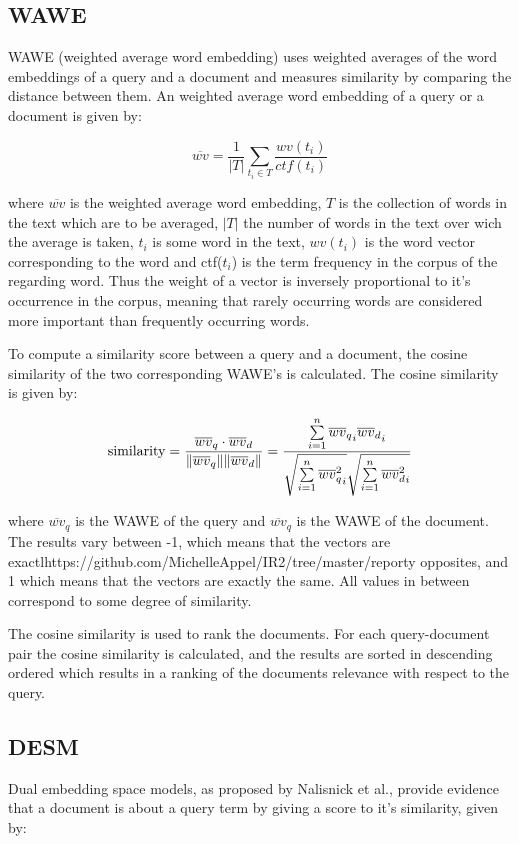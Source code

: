 \documentclass{article}
\begin{document}
\subsection{WAWE}
WAWE (weighted average word embedding) uses weighted averages of the word embeddings of a query and a document and measures similarity by comparing the distance between them. An weighted average word embedding of a query or a document is given by:

$$ \overline{wv} = \frac{1}{|T|} \sum_{t_i \in T} \frac{wv(t_i)}{ctf(t_i)}$$

where $\overline{wv}$ is the weighted average word embedding, $T$ is the collection of words in the text which are to be averaged, $|T|$ the number of words in the text over wich the average is taken, $t_i$ is some word in the text, $wv(t_i)$ is the word vector corresponding to the word and ctf($t_i$) is the term frequency in the corpus of the regarding word. Thus the weight of a vector is inversely proportional to it's occurrence in the corpus, meaning that rarely occurring words are considered more important than frequently occurring words.

To compute a similarity score between a query and a document, the cosine similarity of the two corresponding WAWE's is calculated. The cosine similarity is given by:


$$\text{similarity} = {\overline{wv}_q \cdot \overline{wv}_d \over \|\overline{wv}_q\| \|\overline{wv}_d\|} = \frac{ \sum\limits_{i=1}^{n}{{\overline{wv}_q}_i  {\overline{wv}_d}}_i }{ \sqrt{\sum\limits_{i=1}^{n}{{\overline{wv}_q^2}}_i}  \sqrt{\sum\limits_{i=1}^{n}{{\overline{wv}_d^2}_i}} }$$ 

where $\overline{wv}_q$ is the WAWE of the query and $\overline{wv}_q$ is the WAWE of the document. The results vary between -1, which means that the vectors are exactlhttps://github.com/MichelleAppel/IR2/tree/master/reporty opposites, and 1 which means that the vectors are exactly the same. All values in between correspond to some degree of similarity.

The cosine similarity is used to rank the documents. For each query-document pair the cosine similarity is calculated, and the results are sorted in descending ordered which results in a ranking of the documents relevance with respect to the query.

\subsection{DESM}
Dual embedding space models, as proposed by Nalisnick et al., provide evidence that a document is about a query term by giving a score to it's similarity, given by:
\end{document}
